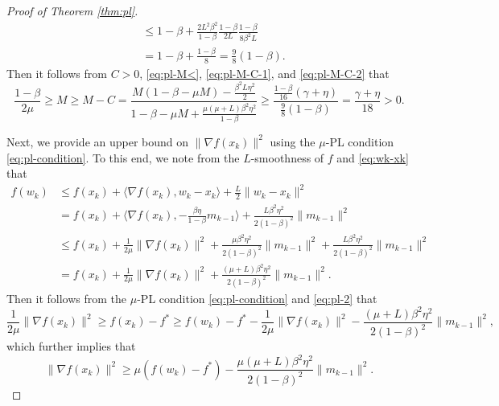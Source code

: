 \documentclass[10pt,a4paper]{amsart}
\begin{document}
\begin{proof}[Proof of Theorem \ref{thm:pl}]
\begin{equation}
\begin{aligned}
& \leq 1-\beta+\frac{2L^2 \beta^2}{1-\beta}\frac{1-\beta}{2 L}\frac{1-\beta}{8 \beta^2 L} \\
& = 1-\beta+\frac{1-\beta}{8} = \frac{9}{8}(1-\beta).
\end{aligned}
\end{equation}
Then it follows from $C>0$, \eqref{eq:pl-M<}, \eqref{eq:pl-M-C-1}, and \eqref{eq:pl-M-C-2} that
\begin{equation}\label{eq:pl-M-C-3}
\frac{1-\beta}{2 \mu} \ge M \ge M-C=\frac{M(1-\beta-\mu M)-\frac{\beta^2 L \eta^2}{2}}{1-\beta-\mu M+\frac{\mu(\mu+L) \beta^2 \eta^2}{1-\beta}} \ge \frac{\frac{1-\beta}{16}(\gamma+\eta)}{\frac{9}{8}(1-\beta)}=\frac{\gamma+\eta}{18}>0.
\end{equation}

Next, we provide an upper bound on $\|\nabla f(x_k)\|^2$ using the $\mu$-PL condition \eqref{eq:pl-condition}. To this end, we note from the $L$-smoothness of $f$ and \eqref{eq:wk-xk} that
\begin{equation}\label{eq:pl-2}
\begin{aligned}
f(w_k) & \leq f(x_k)+\langle\nabla f(x_k), w_k-x_k\rangle+\frac{L}{2}\|w_k-x_k\|^2 \\
& =f(x_k)+\Big\langle\nabla f(x_k),-\frac{\beta \eta}{1-\beta} m_{k-1}\Big\rangle+\frac{L \beta^2 \eta^2}{2(1-\beta)^2}\|m_{k-1}\|^2 \\
& \leq f(x_k)+\frac{1}{2\mu}\|\nabla f(x_k)\|^2+\frac{\mu\beta^2\eta^2}{2 (1-\beta)^2}\|m_{k-1}\|^2+\frac{L \beta^2 \eta^2}{2(1-\beta)^2}\|m_{k-1}\|^2 \\
& =f(x_k)+\frac{1}{2\mu}\|\nabla f(x_k)\|^2+\frac{(\mu+L)\beta^2 \eta^2}{2(1-\beta)^2}\|m_{k-1}\|^2.
\end{aligned}
\end{equation}
Then it follows from the $\mu$-PL condition \eqref{eq:pl-condition} and \eqref{eq:pl-2} that
\[
\frac{1}{2 \mu}\|\nabla f(x_k)\|^2 \ge f(x_k)-f^* \ge f(w_k)-f^*-\frac{1}{2\mu}\|\nabla f(x_k)\|^2-\frac{(\mu+L)\beta^2 \eta^2}{2(1-\beta)^2}\|m_{k-1}\|^2,
\]
which further implies that
\begin{equation}\label{eq:pl-nabla_k}
\|\nabla f(x_k)\|^2 \ge \mu(f(w_k)-f^*)-\frac{\mu (\mu+L)\beta^2 \eta^2}{2(1-\beta)^2}\|m_{k-1}\|^2.
\end{equation}


\end{proof}
\end{document}

